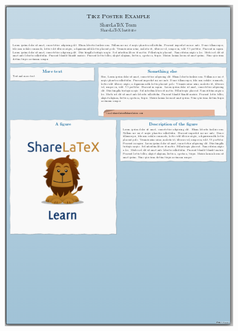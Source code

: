 \documentclass[25pt, a0paper, portrait]{tikzposter}
\begin{document}
\begin{columns}
{\begin{tikzfigure}
	    \includegraphics[width=\linewidth]{Tikzposter_theme/Board}
	\end{tikzfigure}
    }
    {
	\begin{tikzfigure}

\end{tikzfigure}}
\end{columns}
\end{document}
